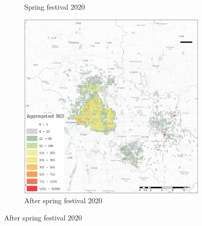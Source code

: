 \documentclass[preprints,ijgi,submit,moreauthors]{Definitions/mdpi}
\begin{document}
\begin{figure}[H]
\begin{subfigure}{.3\textwidth}
        \caption{Spring festival 2020}
    \end{subfigure}
    \begin{subfigure}{.3\textwidth}
        \includegraphics[width=\textwidth]{Figures/BSSPhase3_2020.eps}
        \caption{After spring festival 2020}
    \end{subfigure}
    

\end{figure}
\end{document}
